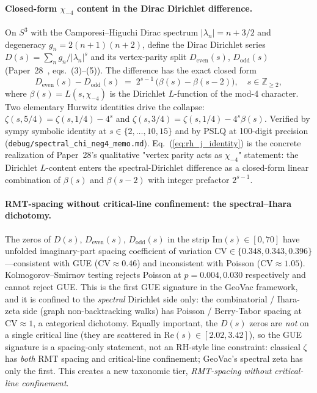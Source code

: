 \documentclass[aps,pra,twocolumn,superscriptaddress,longbibliography]{revtex4-2}
\begin{document}
\paragraph{Closed-form $\chi_{-4}$ content in the Dirac Dirichlet
difference.}  On $S^3$ with the Camporesi--Higuchi Dirac
spectrum $|\lambda_n| = n + 3/2$ and degeneracy $g_n = 2(n+1)(n+2)$,
define the Dirac Dirichlet series $D(s) = \sum_n g_n / |\lambda_n|^s$
and its vertex-parity split $D_{\mathrm{even}}(s)$, $D_{\mathrm{odd}}(s)$
(Paper~28~\cite{loutey_paper28}, eqs.~(3)--(5)). The difference has
the exact closed form
\begin{equation}
  D_{\mathrm{even}}(s) - D_{\mathrm{odd}}(s) \;=\; 2^{s-1}\,\bigl(
    \beta(s) - \beta(s-2)\bigr), \quad s \in \mathbb{Z}_{\ge 2},
  \label{eq:rh_j_identity}
\end{equation}
where $\beta(s) = L(s, \chi_{-4})$ is the Dirichlet $L$-function of
the mod-4 character. Two elementary Hurwitz identities drive the
collapse:
$\zeta(s, 5/4) = \zeta(s, 1/4) - 4^s$ and
$\zeta(s, 3/4) = \zeta(s, 1/4) - 4^s \beta(s)$.
Verified by sympy symbolic identity at $s \in \{2, \ldots, 10, 15\}$
and by PSLQ at 100-digit precision
(\texttt{debug/spectral\_chi\_neg4\_memo.md}).
Eq.~(\ref{eq:rh_j_identity}) is the concrete realization of
Paper~28's qualitative "vertex parity acts as $\chi_{-4}$" statement:
the Dirichlet $L$-content enters the spectral-Dirichlet difference
as a closed-form linear combination of $\beta(s)$ and $\beta(s-2)$
with integer prefactor $2^{s-1}$.

\paragraph{RMT-spacing without critical-line confinement: the
spectral--Ihara dichotomy.}  The zeros of $D(s)$,
$D_{\mathrm{even}}(s)$, $D_{\mathrm{odd}}(s)$ in the strip
$\mathrm{Im}(s) \in [0, 70]$ have unfolded imaginary-part spacing
coefficient of variation $\mathrm{CV} \in \{0.348, 0.343, 0.396\}$
---consistent with GUE ($\mathrm{CV} \approx 0.46$) and inconsistent
with Poisson ($\mathrm{CV} \approx 1.05$). Kolmogorov--Smirnov testing
rejects Poisson at $p = 0.004, 0.030$ respectively and cannot reject
GUE. This is the first GUE signature in the GeoVac framework, and
it is confined to the \emph{spectral} Dirichlet side only: the
combinatorial / Ihara-zeta side (graph non-backtracking walks) has
Poisson / Berry-Tabor spacing at $\mathrm{CV} \approx 1$, a categorical
dichotomy. Equally important, the $D(s)$ zeros are \emph{not} on a
single critical line (they are scattered in
$\mathrm{Re}(s) \in [2.02, 3.42]$), so the GUE signature is a
spacing-only statement, not an RH-style line constraint: classical
$\zeta$ has \emph{both} RMT spacing and critical-line confinement;
GeoVac's spectral zeta has only the first. This creates a new
taxonomic tier, \emph{RMT-spacing without critical-line confinement}.
\end{document}
